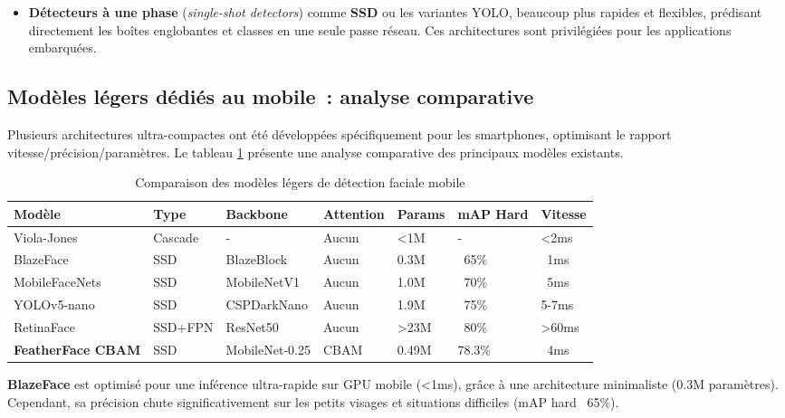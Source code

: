 \begin{onehalfspace}
\begin{itemize}
\item \textbf{Détecteurs à une phase} (\textit{single-shot detectors}) comme \textbf{SSD} \cite{Liu2016SSD} ou les variantes YOLO, beaucoup plus rapides et flexibles, prédisant directement les boîtes englobantes et classes en une seule passe réseau. Ces architectures sont privilégiées pour les applications embarquées.
\end{itemize}

\subsection{Modèles légers dédiés au mobile~: analyse comparative}

\hspace{0.65 cm}Plusieurs architectures ultra-compactes ont été développées spécifiquement pour les smartphones, optimisant le rapport vitesse/précision/paramètres. Le tableau \ref{tab:comparison_models} présente une analyse comparative des principaux modèles existants.

\begin{table}[H]
\centering
\caption{Comparaison des modèles légers de détection faciale mobile}
\label{tab:comparison_models}
\scriptsize
\begin{tabularx}{\textwidth}{p{2.5cm}p{1.5cm}p{1.8cm}p{2cm}p{1cm}p{1.3cm}p{1.2cm}}
\hline
\textbf{Modèle} & \textbf{Type} & \textbf{Backbone} & \textbf{Attention} & \textbf{Params} & \textbf{mAP Hard} & \textbf{Vitesse} \\
\hline
Viola-Jones & Cascade & - & Aucun & <1M & - & <2ms \\
\hline
BlazeFace & SSD & BlazeBlock & Aucun & 0.3M & ~65\% & ~1ms \\
\hline
MobileFaceNets & SSD & MobileNetV1 & Aucun & 1.0M & ~70\% & ~5ms \\
\hline
YOLOv5-nano & SSD & CSPDarkNano & Aucun & 1.9M & ~75\% & 5-7ms \\
\hline
RetinaFace & SSD+FPN & ResNet50 & Aucun & >23M & ~80\% & >60ms \\
\hline
\textbf{FeatherFace CBAM} & SSD & MobileNet-0.25 & CBAM & 0.49M & 78.3\% & ~4ms \\
\hline
\end{tabularx}
\end{table}

\hspace{0.65 cm}\textbf{BlazeFace} \cite{Zhang2019BlazeFace} est optimisé pour une inférence ultra-rapide sur GPU mobile (<1ms), grâce à une architecture minimaliste (0.3M paramètres). Cependant, sa précision chute significativement sur les petits visages et situations difficiles (mAP hard ~65\%).


\end{onehalfspace}
